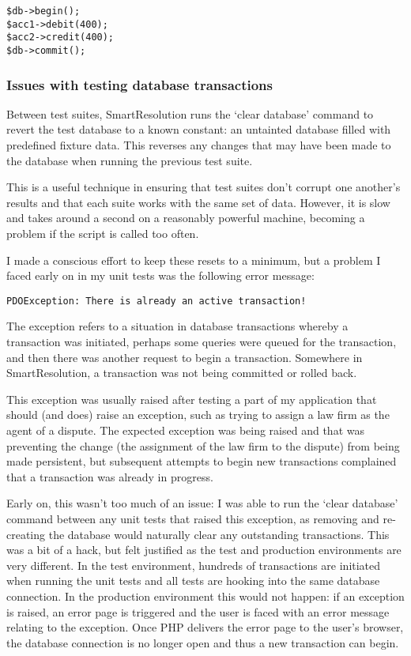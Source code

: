 \begin{lstlisting}
$db->begin();
$acc1->debit(400);
$acc2->credit(400);
$db->commit();
\end{lstlisting}

\subsubsection{Issues with testing database transactions}

Between test suites, SmartResolution runs the `clear database' command to revert the test database to a known constant: an untainted database filled with predefined fixture data. This reverses any changes that may have been made to the database when running the previous test suite.

This is a useful technique in ensuring that test suites don't corrupt one another's results and that each suite works with the same set of data. However, it is slow and takes around a second on a reasonably powerful machine, becoming a problem if the script is called too often.

I made a conscious effort to keep these resets to a minimum, but a problem I faced early on in my unit tests was the following error message:

\begin{lstlisting}
PDOException: There is already an active transaction!
\end{lstlisting}

The exception refers to a situation in database transactions whereby a transaction was initiated, perhaps some queries were queued for the transaction, and then there was another request to begin a transaction. Somewhere in SmartResolution, a transaction was not being committed or rolled back.

This exception was usually raised after testing a part of my application that should (and does) raise an exception, such as trying to assign a law firm as the agent of a dispute. The expected exception was being raised and that was preventing the change (the assignment of the law firm to the dispute) from being made persistent, but subsequent attempts to begin new transactions complained that a transaction was already in progress.

Early on, this wasn't too much of an issue: I was able to run the `clear database' command between any unit tests that raised this exception, as removing and re-creating the database would naturally clear any outstanding transactions. This was a bit of a hack, but felt justified as the test and production environments are very different. In the test environment, hundreds of transactions are initiated when running the unit tests and all tests are hooking into the same database connection. In the production environment this would not happen: if an exception is raised, an error page is triggered and the user is faced with an error message relating to the exception. Once PHP delivers the error page to the user's browser, the database connection is no longer open and thus a new transaction can begin.

